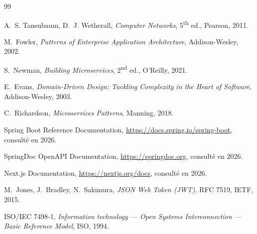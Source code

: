 \documentclass[12pt,a4paper]{report}
\theoremstyle{definition}
\theoremstyle{remark}
\begin{document}
\begin{thebibliography}{99}

	A.~S. Tanenbaum, D.~J. Wetherall,
	\textit{Computer Networks}, 5\textsuperscript{th} ed.,
	Pearson, 2011.

	M.~Fowler,
	\textit{Patterns of Enterprise Application Architecture},
	Addison-Wesley, 2002.

	S.~Newman,
	\textit{Building Microservices}, 2\textsuperscript{nd} ed.,
	O'Reilly, 2021.

	E.~Evans,
	\textit{Domain-Driven Design: Tackling Complexity in the Heart of Software},
	Addison-Wesley, 2003.

	C.~Richardson,
	\textit{Microservices Patterns},
	Manning, 2018.

	Spring Boot Reference Documentation,
	\url{https://docs.spring.io/spring-boot}, consulté en 2026.

	SpringDoc OpenAPI Documentation,
	\url{https://springdoc.org}, consulté en 2026.

	Next.js Documentation,
	\url{https://nextjs.org/docs}, consulté en 2026.

	M.~Jones, J.~Bradley, N.~Sakimura,
	\textit{JSON Web Token (JWT)}, RFC 7519,
	IETF, 2015.

	ISO/IEC 7498-1,
	\textit{Information technology — Open Systems Interconnection — Basic Reference Model},
	ISO, 1994.

\end{thebibliography}
\end{document}
